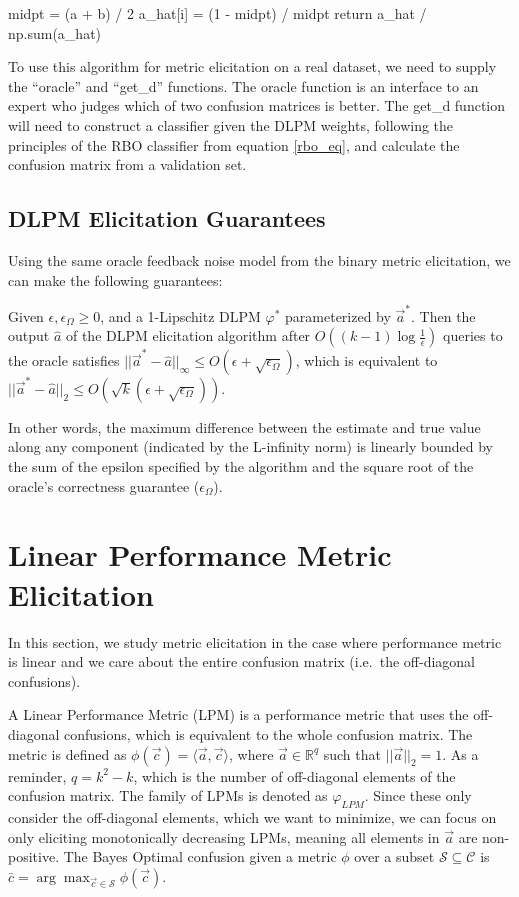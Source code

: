 \documentclass[
  letterpaper,
  DIV=11,
  numbers=noendperiod,
  oneside]{scrreprt}
\theoremstyle{remark}
\begin{document}
midpt = (a + b) / 2 a\_hat{[}i{]} = (1 - midpt) / midpt return a\_hat /
np.sum(a\_hat)

To use this algorithm for metric elicitation on a real dataset, we need
to supply the ``oracle'' and ``get\_d'' functions. The oracle function
is an interface to an expert who judges which of two confusion matrices
is better. The get\_d function will need to construct a classifier given
the DLPM weights, following the principles of the RBO classifier from
equation \hyperref[rbo_eq]{{[}rbo\_eq{]}}, and calculate the confusion
matrix from a validation set.

\subsection{DLPM Elicitation
Guarantees}\label{dlpm-elicitation-guarantees}

Using the same oracle feedback noise model from the binary metric
elicitation, we can make the following guarantees:

Given \(\epsilon, \epsilon_\Omega \geq 0\), and a 1-Lipschitz DLPM
\(\varphi^*\) parameterized by \(\vec{a}^*\). Then the output
\(\hat{a}\) of the DLPM elicitation algorithm after
\(O((k-1)\log\frac{1}{\epsilon})\) queries to the oracle satisfies
\(||\vec{a}^* - \hat{a}||_\infty \leq O(\epsilon + \sqrt{\epsilon_\Omega})\),
which is equivalent to
\(||\vec{a}^* - \hat{a}||_2 \leq O(\sqrt{k}(\epsilon + \sqrt{\epsilon_\Omega}))\).

In other words, the maximum difference between the estimate and true
value along any component (indicated by the L-infinity norm) is linearly
bounded by the sum of the epsilon specified by the algorithm and the
square root of the oracle's correctness guarantee (\(\epsilon_\Omega\)).

\section{Linear Performance Metric
Elicitation}\label{linear-performance-metric-elicitation}

In this section, we study metric elicitation in the case where
performance metric is linear and we care about the entire confusion
matrix (i.e.~the off-diagonal confusions).

A Linear Performance Metric (LPM) is a performance metric that uses the
off-diagonal confusions, which is equivalent to the whole confusion
matrix. The metric is defined as
\(\phi(\vec{c}) = \langle \vec{a}, \vec{c} \rangle\), where
\(\vec{a} \in \mathbb{R}^q\) such that \(||\vec{a}||_2 = 1\). As a
reminder, \(q = k^2 - k\), which is the number of off-diagonal elements
of the confusion matrix. The family of LPMs is denoted as
\(\varphi_{LPM}\). Since these only consider the off-diagonal elements,
which we want to minimize, we can focus on only eliciting monotonically
decreasing LPMs, meaning all elements in \(\vec{a}\) are non-positive.
The Bayes Optimal confusion given a metric \(\phi\) over a subset
\(\mathcal{S} \subseteq \mathcal{C}\) is
\(\bar{c} = \arg\max_{\vec{c} \in \mathcal{S}} \phi(\vec{c})\).
\end{document}

